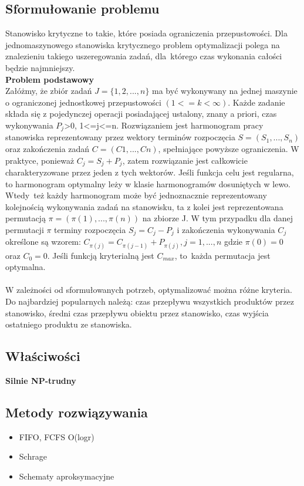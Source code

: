 \documentclass[10pt, a
4paper]{article}
\begin{document}
\subsection{Sformułowanie problemu}
\indent Stanowisko krytyczne to takie, które posiada ograniczenia przepustowości. Dla jednomaszynowego stanowiska krytycznego problem optymalizacji polega na znalezieniu takiego uszeregowania zadań, dla~którego czas wykonania całości będzie najmniejszy.\\
\textbf{Problem podstawowy}\\
\indent Załóżmy, że zbiór zadań $J=\{1,2,...,n\}$ ma być wykonywany na jednej maszynie o ograniczonej jednostkowej przepustowości $(1<=k<\infty)$. Każde zadanie składa się z pojedynczej operacji posiadającej ustalony, znany a priori, czas wykonywania $P_{j}$>0, 1<=j<=n. Rozwiązaniem jest harmonogram pracy stanowiska reprezentowany przez wektory terminów rozpoczęcia $S=(S_{1},...,S_{n})$ oraz zakończenia zadań $C=(C1,...,Cn)$, spełniające powyższe ograniczenia. W praktyce, ponieważ $C_{j}=S_{j}+P_j$, zatem rozwiązanie jest całkowicie charakteryzowane przez jeden z tych wektorów. Jeśli funkcja celu jest regularna, to harmonogram optymalny leży w klasie harmonogramów dosuniętych w lewo. Wtedy~też każdy harmonogram może być jednoznacznie reprezentowany kolejnością wykonywania zadań na stanowisku, ta z kolei jest reprezentowana permutacją 
$\pi =(\pi(1),...,\pi(n))$ na zbiorze J. W tym przypadku dla danej permutacji $\pi$ terminy rozpoczęcia $S_{j}=C_{j}-P_{j}$ i zakończenia wykonywania $C_{j}$ określone są wzorem:
$C_{\pi(j)}=C_{\pi(j-1)} + P_{\pi(j)}, j=1,...,n$
gdzie $\pi(0)=0$ oraz $C_{0}=0.$ Jeśli funkcją kryterialną jest $C_{max}$, to~każda permutacja jest optymalna.\\\\
\indent W zależności od sformułowanych potrzeb, optymalizować można różne kryteria. Do najbardziej popularnych należą: czas przepływu wszystkich produktów przez stanowisko, średni czas przepływu obiektu przez stanowisko, czas wyjścia ostatniego produktu ze stanowiska.
\subsection{Właściwości}
\noindent \textbf{Silnie NP-trudny}\\
\subsection{Metody rozwiązywania}
\begin{itemize}
\item FIFO, FCFS O(logr)
\item Schrage
\item Schematy aproksymacyjne
\end{itemize}
\end{document}
